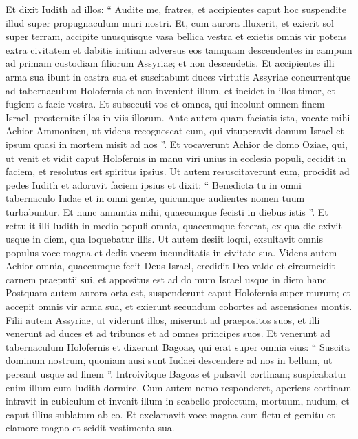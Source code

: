 \begin{biblechapter}
\begin{biblechapter}
\begin{biblechapter}
\begin{biblechapter}
\begin{biblechapter}
\begin{biblechapter}
\begin{biblechapter}
\begin{biblechapter}
\begin{biblechapter}
\begin{biblechapter}
\begin{biblechapter}
\begin{biblechapter}
\begin{biblechapter}
\begin{biblechapter}
\verse Et dixit Iudith ad illos: “ Audite me, fratres, et accipientes caput hoc suspendite illud super propugnaculum muri nostri. 
\verse Et, cum aurora illuxerit, et exierit sol super terram, accipite unusquisque vasa bellica vestra et exietis omnis vir potens extra civitatem et dabitis initium adversus eos tamquam descendentes in campum ad primam custodiam filiorum Assyriae; et non descendetis. 
\verse Et accipientes illi arma sua ibunt in castra sua et suscitabunt duces virtutis Assyriae concurrentque ad tabernaculum Holofernis et non invenient illum, et incidet in illos timor, et fugient a facie vestra. 
\verse Et subsecuti vos et omnes, qui incolunt omnem finem Israel, prosternite illos in viis illorum.
 \verse Ante autem quam faciatis ista, vocate mihi Achior Ammoniten, ut videns recognoscat eum, qui vituperavit domum Israel et ipsum quasi in mortem misit ad nos ”. 
\verse Et vocaverunt Achior de domo Oziae, qui, ut venit et vidit caput Holofernis in manu viri unius in ecclesia populi, cecidit in faciem, et resolutus est spiritus ipsius. 
\verse Ut autem resuscitaverunt eum, procidit ad pedes Iudith et adoravit faciem ipsius et dixit: “ Benedicta tu in omni tabernaculo Iudae et in omni gente, quicumque audientes nomen tuum turbabuntur. 
 \verse Et nunc annuntia mihi, quaecumque fecisti in diebus istis ”. Et rettulit illi Iudith in medio populi omnia, quaecumque fecerat, ex qua die exivit usque in diem, qua loquebatur illis. 
\verse Ut autem desiit loqui, exsultavit omnis populus voce magna et dedit vocem iucunditatis in civitate sua. 
\verse Videns autem Achior omnia, quaecumque fecit Deus Israel, credidit Deo valde et circumcidit carnem praeputii sui, et appositus est ad do mum Israel usque in diem hanc. 
\verse Postquam autem aurora orta est, suspenderunt caput Holofernis super murum; et accepit omnis vir arma sua, et exierunt secundum cohortes ad ascensiones montis. 
\verse Filii autem Assyriae, ut viderunt illos, miserunt ad praepositos suos, et illi venerunt ad duces et ad tribunos et ad omnes principes suos. 
\verse Et venerunt ad tabernaculum Holofernis et dixerunt Bagoae, qui erat super omnia eius: “ Suscita dominum nostrum, quoniam ausi sunt Iudaei descendere ad nos in bellum, ut pereant usque ad finem ”. 
\verse Introivitque Bagoas et pulsavit cortinam; suspicabatur enim illum cum Iudith dormire. 
\verse Cum autem nemo responderet, aperiens cortinam intravit in cubiculum et invenit illum in scabello proiectum, mortuum, nudum, et caput illius sublatum ab eo. 
\verse Et exclamavit voce magna cum fletu et gemitu et clamore magno et scidit vestimenta sua. 

\end{biblechapter}
\end{biblechapter}
\end{biblechapter}
\end{biblechapter}
\end{biblechapter}
\end{biblechapter}
\end{biblechapter}
\end{biblechapter}
\end{biblechapter}
\end{biblechapter}
\end{biblechapter}
\end{biblechapter}
\end{biblechapter}
\end{biblechapter}
